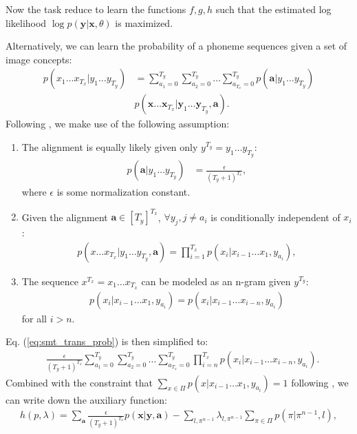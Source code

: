 \documentclass[a4paper]{article}
\begin{document}
Now the task reduce to learn the functions $f, g, h$ such that the estimated log likelihood $\log p(\mathbf{y}|\mathbf{x}, \theta)$ is maximized.

Alternatively, we can learn the probability of a phoneme sequences given a set of image concepts:
\begin{align}\label{eq:smt_trans_prob}
    p(x_1\ldots x_{T_x}|y_1\ldots y_{T_y}) &= \sum_{a_1 = 0}^{T_y} \sum_{a_2 = 0}^{T_y}\ldots \sum_{a_{T_x} = 0}^{T_y} p(\mathbf a|y_1\ldots y_{T_y})  \\
    &p(\mathbf x \ldots \mathbf x_{T_x}|\mathbf{y}_1\ldots \mathbf y_{T_y}, \mathbf{a}).
\end{align}
Following \cite{Brown92}, we make use of the following assumption:
\begin{enumerate}
    \item The alignment is equally likely given only $y^{T_y}=y_1\ldots y_{T_y}$: 
    \begin{align}\label{eq:ibm1_align_prob}
        p(\mathbf a|y_1\ldots y_{T_y}) &= \frac{\epsilon}{(T_y+1)^{T_x}},
    \end{align}
    where $\epsilon$ is some normalization constant.
    \item Given the alignment $\mathbf a \in [T_y]^{T_x}$, $\forall y_j, j\neq a_i$ is conditionally independent of $x_i$:
    \begin{align}\label{eq:ibm1_trans_prob}
        p( x \ldots  x_{T_x}|y_1\ldots y_{T_y}, \mathbf{a}) = \prod_{i=1}^{T_x} p(x_i|x_{i-1}\ldots x_{1}, y_{a_i}),
    \end{align}
    \item The sequence $x^{T_x} = x_1 \ldots x_{T_x}$ can be modeled as an n-gram given $y^{T_y}$:
    \begin{align}
        p(x_i|x_{i-1}\ldots x_{1}, y_{a_i}) = p(x_i|x_{i-1}\ldots x_{i-n}, y_{a_i})
    \end{align}
    for all $i>n$.
        
\end{enumerate}
Eq. (\ref{eq:smt_trans_prob}) is then simplified to:
\begin{align}
    &\frac{\epsilon}{(T_y+1)^{T_x}}\sum_{a_1 = 0}^{T_y} \sum_{a_2 = 0}^{T_y}\ldots \sum_{a_{T_x} = 0}^{T_y} 
    \prod_{i=n}^{T_x}p(x_i| x_{i-1}\ldots x_{i-n}, y_{a_i}).
\end{align}
Combined with the constraint that $\sum_{x\in\Pi} p(x| x_{i-1}\ldots x_1, y_{a_i}) = 1$ following \cite{Brown92}, we can write down the auxiliary function:
\begin{align}\label{eq:ibm1_auxiliary}
    h(p, \lambda) = \sum_{\mathbf{a}}\frac{\epsilon}{(T_y+1)^{T_x}} p(\mathbf x|\mathbf y, \mathbf a) - \sum_{l, \pi^{n-1}} \lambda_{l, \pi^{n-1}} \sum_{\pi \in \Pi} p(\pi|\pi^{n-1}, l),
\end{align}
\end{document}

